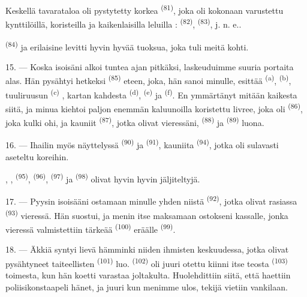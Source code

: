 Keskellä tavarataloa oli pystytetty korkea 
\textsuperscript{(81)}, joka oli kokonaan varustettu kynttilöillä, koristeilla ja
kaikenlaisilla leluilla :  \textsuperscript{(82)},
 \textsuperscript{(83)}, j. n. e..

 \textsuperscript{(84)}  ja
erilaisine  levitti hyvin hyvää tuoksua, joka tuli meitä
kohti.

\VUsaut{3.4mm}
\VUsaut{2.8mm}

15. --- Koska isoisäni alkoi tuntea ajan pitkäksi, laskeuduimme suuria portaita
alas. Hän pysähtyi hetkeksi 
\textsuperscript{(85)} eteen, joka, hän sanoi minulle, esittää
 \textsuperscript{(a)},  \textsuperscript{(b)}, tuuliruusun  \textsuperscript{(c)} , kartan kahdesta  \textsuperscript{(d)},
 \textsuperscript{(e)} ja 
\textsuperscript{(f)}. En ymmärtänyt mitään kaikesta siitä, ja minua kiehtoi
paljon enemmän kaluunoilla koristettu livree, joka oli
 \textsuperscript{(86)}, joka kulki ohi, ja kauniit
 \textsuperscript{(87)}, jotka olivat vieressäni,
 \textsuperscript{(88)} ja 
\textsuperscript{(89)} luona.

16. --- Ihailin myös näyttelyssä  \textsuperscript{(90)} ja
 \textsuperscript{(91)}, kauniita 
\textsuperscript{(94)}, jotka oli sulavasti aseteltu koreihin.

, , 
\textsuperscript{(95)},  \textsuperscript{(96)},
 \textsuperscript{(97)} ja 
\textsuperscript{(98)} olivat hyvin hyvin jäljiteltyjä.

\VUsaut{4.4mm}
\VUsaut{2.8mm}

17. --- Pyysin isoisääni ostamaan minulle yhden niistä 
\textsuperscript{(92)}, jotka olivat rasiassa 
\textsuperscript{(93)} vieressä. Hän suostui, ja menin itse maksamaan ostokseni
kassalle, jonka vieressä valmistettiin tärkeää 
\textsuperscript{(100)} eräälle  \textsuperscript{(99)}.

18. --- Äkkiä syntyi lievä hämminki niiden ihmisten keskuudessa, jotka olivat
pysähtyneet taiteellisten  \textsuperscript{(101)} luo.
 \textsuperscript{(102)} oli juuri otettu kiinni itse teosta
 \textsuperscript{(103)} toimesta, kun hän koetti varastaa
joltakulta. Huolehdittiin siitä, että haettiin poliisikonstaapeli
 hänet, ja juuri kun menimme ulos, tekijä vietiin
vankilaan.

\VUsaut{6.0mm}
\VUfilet{22mm}

